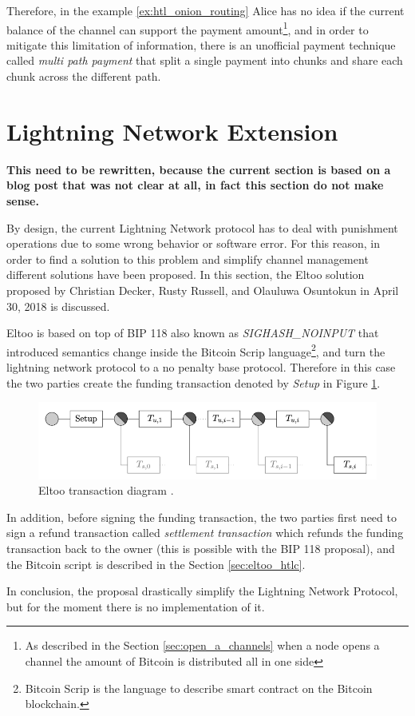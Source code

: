 Therefore, in the example \ref{ex:htl_onion_routing} Alice has no idea if the current balance of the channel can support the payment amount\footnote{As described in the Section \ref{sec:open_a_channels} when a node opens a channel the amount of Bitcoin is distributed all in one side}, and in order to mitigate this limitation of information, there is an unofficial payment technique called \emph{multi path payment} that split a single payment into chunks and share each chunk across the different path.

\section{Lightning Network Extension}
\label{sec:eltoo}

{\bf This need to be rewritten, because the current section is based on a blog post that was not clear at all, in fact this section do not make sense.}

By design, the current Lightning Network protocol has to deal with punishment operations due to some wrong behavior or software error. For this reason, in order
to find a solution to this problem and simplify channel management different solutions have been proposed.
In this section, the Eltoo\cite{eltoo} solution proposed by Christian Decker, Rusty Russell, and Olauluwa Osuntokun in April 30, 2018 is discussed.

Eltoo is based on top of BIP 118 \cite{bip118} also known as \emph{SIGHASH\_NOINPUT} that introduced semantics change inside the Bitcoin Scrip language\footnote{Bitcoin Scrip is the language to describe smart contract on the Bitcoin blockchain.}, and turn the lightning network protocol to a no penalty base protocol.
Therefore in this case the two parties create the funding transaction denoted by \emph{Setup} in Figure \ref{fig:eltoo_diagram_tx}.

\begin{figure}[h]
  \begin{center}
    \includegraphics[width=0.6\columnwidth]{imgs/1_USwvkUzr2-EHHkImnYz6gw.png}
  \end{center}
  \caption{Eltoo transaction diagram \cite{eltoo}.}
  \label{fig:eltoo_diagram_tx}
\end{figure}


In addition, before signing the funding transaction, the two parties first need to sign a refund transaction called \emph{settlement transaction} which refunds the funding transaction back to the owner (this is possible with the BIP 118\cite{bip118} proposal), and the Bitcoin script is described in the Section \ref{sec:eltoo_htlc}.

In conclusion, the proposal drastically simplify the Lightning Network Protocol, but for the moment there is no implementation of it.
